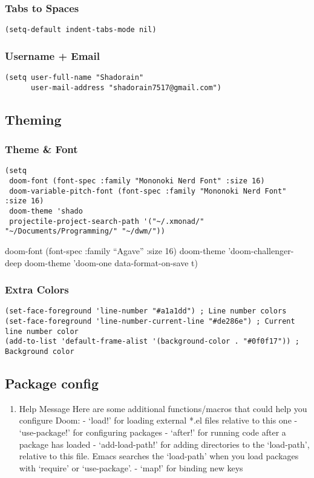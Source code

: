 \documentclass[11pt]{article}
\begin{document}
\subsubsection{Tabs to Spaces}
\label{sec:org01808c5}
\begin{verbatim}
(setq-default indent-tabs-mode nil)
\end{verbatim}
\subsubsection{Username + Email}
\label{sec:orgdc8c5a9}
\begin{verbatim}
(setq user-full-name "Shadorain"
      user-mail-address "shadorain7517@gmail.com")
\end{verbatim}
\subsection{Theming}
\label{sec:org35b5390}
\subsubsection{Theme \& Font}
\label{sec:orga659a29}
\begin{verbatim}
(setq
 doom-font (font-spec :family "Mononoki Nerd Font" :size 16)
 doom-variable-pitch-font (font-spec :family "Mononoki Nerd Font" :size 16)
 doom-theme 'shado
 projectile-project-search-path '("~/.xmonad/" "~/Documents/Programming/" "~/dwm/"))
\end{verbatim}
doom-font (font-spec :family ``Agave'' :size 16)
doom-theme 'doom-challenger-deep
doom-theme 'doom-one
data-format-on-save t)
\subsubsection{Extra Colors}
\label{sec:orge3b2436}
\begin{verbatim}
(set-face-foreground 'line-number "#a1a1dd") ; Line number colors
(set-face-foreground 'line-number-current-line "#de286e") ; Current line number color
(add-to-list 'default-frame-alist '(background-color . "#0f0f17")) ; Background color
\end{verbatim}

\subsection{Package config}
\label{sec:org17be52a}
\begin{enumerate}
\item Help Message
\label{sec:org7281874}
Here are some additional functions/macros that could help you configure Doom: - `load!' for loading external *.el files relative to this one - `use-package!' for configuring packages - `after!' for running code after a package has loaded - `add-load-path!' for adding directories to the `load-path', relative to this file. Emacs searches the `load-path' when you load packages with `require' or `use-package'. - `map!' for binding new keys
\end{enumerate}
\end{document}
